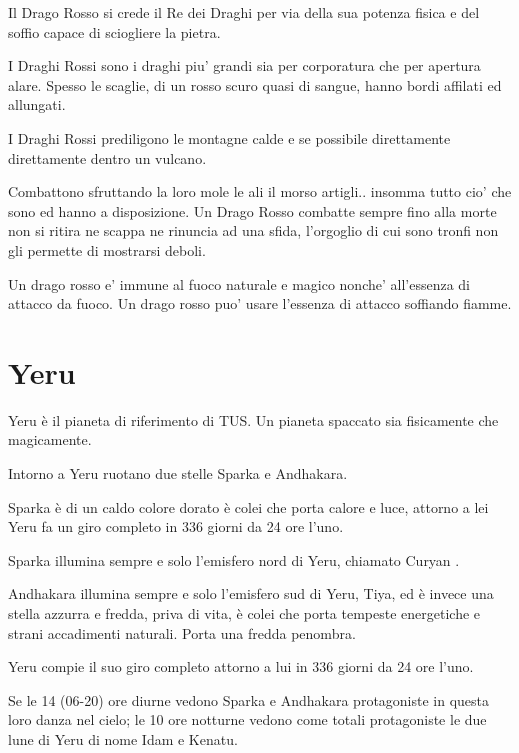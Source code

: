 \documentclass[a4paper,11pt,twoside,openany]{book}
\begin{document}
Il Drago Rosso si crede il Re dei Draghi per via della sua potenza fisica e del soffio capace di sciogliere la pietra.

I Draghi Rossi sono i draghi piu' grandi sia per corporatura che per apertura alare.
Spesso le scaglie, di un rosso scuro quasi di sangue, hanno bordi affilati ed allungati.

I Draghi Rossi prediligono le montagne calde e se possibile direttamente direttamente dentro un vulcano.

Combattono sfruttando la loro mole le ali il morso artigli.. insomma tutto cio' che sono ed hanno a disposizione. Un Drago Rosso combatte sempre fino alla morte non si ritira ne scappa ne rinuncia ad una sfida, l'orgoglio di cui sono tronfi non gli permette di mostrarsi deboli.

Un drago rosso e' immune al fuoco naturale e magico nonche' all'essenza di attacco da fuoco.
Un drago rosso puo' usare l'essenza di attacco soffiando fiamme.



\pagebreak

\section{Yeru}

\label{yeru}

Yeru è il pianeta di riferimento di TUS. Un pianeta spaccato sia fisicamente che magicamente.

Intorno a Yeru ruotano due stelle Sparka e Andhakara.

Sparka è di un caldo colore dorato è colei che porta calore e luce, attorno a lei Yeru fa un giro completo in 336 giorni da 24 ore l'uno.

Sparka illumina sempre e solo l'emisfero nord di Yeru, chiamato Curyan .

Andhakara illumina sempre e solo l'emisfero sud di Yeru, Tiya, ed è invece una stella azzurra e fredda, priva di vita, è colei che porta tempeste energetiche e strani accadimenti naturali. Porta una fredda penombra.

Yeru compie il suo giro completo attorno a lui in 336 giorni da 24 ore l'uno.

Se le 14 (06-20) ore diurne vedono Sparka e Andhakara protagoniste in questa loro danza nel cielo; le 10 ore notturne vedono come totali protagoniste le due lune di Yeru di nome Idam e Kenatu.
\end{document}
